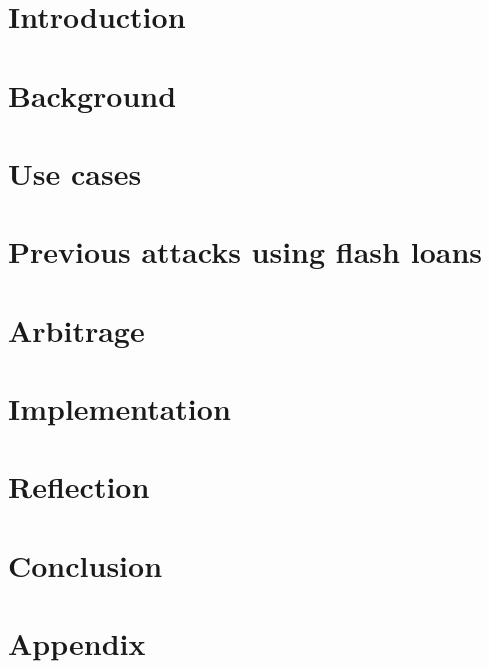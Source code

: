 


\begin{abstract}
    
\end{abstract}

\section{Introduction}\label{intro}


\section{Background}\label{back}


\section{Use cases}\label{use}


\section{Previous attacks using flash loans}\label{ex}


\section{Arbitrage}\label{arb}


\section{Implementation}\label{imp}


\section{Reflection}\label{eval}


\section{Conclusion}\label{con}


\section{Appendix}\label{con}


\newpage
\printbibliography


